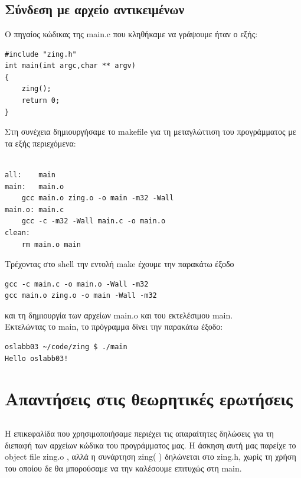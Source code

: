 \documentclass[a4paper,10pt]{article} \usepackage{anysize}
\begin{document}


\section*{} \setcounter{section}{1}
\subsection{Σύνδεση με αρχείο αντικειμένων} Ο πηγαίος κώδικας της main.c που
κληθήκαμε να γράψουμε ήταν ο εξής:

\begin{verbatim}
#include "zing.h"
int main(int argc,char ** argv)
{
	zing();
	return 0;
}
\end{verbatim}

Στη συνέχεια δημιουργήσαμε το makefile για  τη μεταγλώττιση του προγράμματος
με τα εξής περιεχόμενα:

\begin{verbatim}

all:	main
main:	main.o
	gcc main.o zing.o -o main -m32 -Wall
main.o:	main.c
	gcc -c -m32 -Wall main.c -o main.o
clean:
	rm main.o main

\end{verbatim}
Τρέχοντας στο shell την εντολή make έχουμε την παρακάτω έξοδο
\begin{verbatim}
gcc -c main.c -o main.o -Wall -m32
gcc main.o zing.o -o main -Wall -m32
\end{verbatim}
και τη δημιουργία των αρχείων main.o και του εκτελέσιμου main.\\
Εκτελώντας το main, το πρόγραμμα δίνει την παρακάτω έξοδο:
\begin{verbatim}
oslabb03 ~/code/zing $ ./main
Hello oslabb03!
\end{verbatim}


\pagebreak
\section*{Απαντήσεις στις θεωρητικές ερωτήσεις}
\subsection{}
Η επικεφαλίδα που χρησιμοποιήσαμε περιέχει τις απαραίτητες  δηλώσεις για τη
διεπαφή των αρχείων κώδικα του προγράμματος μας. 
Η άσκηση αυτή μας παρείχε το object file zing.o , αλλά η συνάρτηση zing( )
δηλώνεται στο zing.h, χωρίς τη χρήση του οποίου δε θα μπορούσαμε να την
καλέσουμε επιτυχώς στη main.
\end{document}
